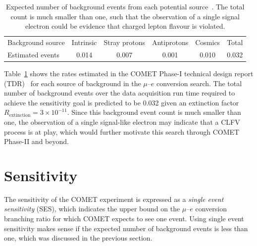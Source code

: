 \begin{table}
    \centering
    \begin{tabular}{l|cccc|c}
        \toprule
        Background source & Intrinsic & Stray protons & Antiprotons &
        Cosmics  & Total\\ 
        Estimated events & 0.014 & 0.007 & 0.001 & 0.010 & 0.032 \\ \bottomrule
    \end{tabular}
    \caption{Expected number of background events from each potential
    source~\cite{the_comet_collaboration_comet_2020}. The total count is much
    smaller than one, such that the observation of a single signal electron
    could be evidence that charged lepton flavour is violated.}
    \label{tab:backgrounds}
\end{table}


Table~\ref{tab:backgrounds} shows the rates estimated in the COMET Phase-I
technical design report (TDR)~\cite[Section
10.6]{the_comet_collaboration_comet_2020} for each source of background in the
$\mu$--$e$ conversion search. The total number of background events over the
data acquisition run time required to achieve the sensitivity goal is predicted
to be 0.032 given an extinction factor $R_\mathrm{extinction} = 3 \times
10^{-11}$. Since this background event count is much smaller than one, the
observation of a single signal-like electron may indicate that a CLFV process is
at play, which would further motivate this search through COMET Phase-II and beyond.





\section{Sensitivity}\label{sec:SES}

The sensitivity of the COMET experiment is expressed as a \emph{single event
sensitivity} (SES), which indicates the upper bound on the $\mu$--$e$
conversion branching ratio for which COMET expects to see one event. Using
single event sensitivity makes sense if the expected number of background events
is less than one, which was discussed in the previous section.

